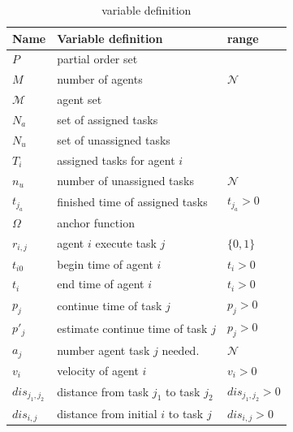 \begin{table}[h]
	\begin{tabular}{|l|p{}|p{}|}\hline
		Name & Variable definition & range \\\hline
		$P$ & partial order set& \\
		$M$  & number of agents & $\mathcal{N}$\\
		$\mathcal{M}$  & agent set & \\
		$N_a$ & set of assigned tasks &  \\
		$N_u$ & set of unassigned tasks &  \\
		$T_i$ & assigned tasks for agent $i$ &  \\

		$n_u$ & number of unassigned tasks & $\mathcal{N}$ \\
		$t_{j_a}$ & finished time of assigned tasks & $t_{j_a}>0$\\
		$\Omega$ & anchor function &\\
		$r_{i,j}$ & agent $i$ execute task $j$ & $\{0,1\}$\\
		$t_{i0}$ & begin time of agent $i$ & $t_i>0$ \\
		$t_i$ & end time of agent $i$ & $t_i>0$ \\
		$p_j$ & continue time of task $j$ & $p_j >0$\\
		$p'_j$ & estimate continue time of task $j$ & $p_j >0$\\
		$a_{j}$ & number agent task $j$ needed. & $\mathcal{N}$\\
		$v_i$ & velocity of agent $i$ &   $v_i>0$\\
		$dis_{j_1,j_2}$ & distance from task $j_1$ to task $j_2$ &  $dis_{j_1,j_2}>0$\\
		$dis_{i,j}$ & distance from initial $i$ to task $j$ & $dis_{i,j}>0$\\\hline
	\end{tabular}
	\centering
	\caption{variable definition}
	\label{}
\end{table}




